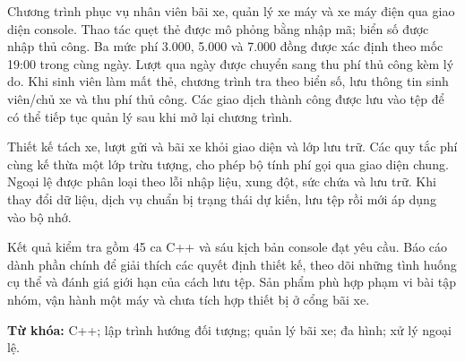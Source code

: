 Chương trình phục vụ nhân viên bãi xe, quản lý xe máy và xe máy điện qua giao diện console. Thao tác quẹt thẻ được mô phỏng bằng nhập mã; biển số được nhập thủ công. Ba mức phí 3.000, 5.000 và 7.000 đồng được xác định theo mốc 19:00 trong cùng ngày. Lượt qua ngày được chuyển sang thu phí thủ công kèm lý do. Khi sinh viên làm mất thẻ, chương trình tra theo biển số, lưu thông tin sinh viên/chủ xe và thu phí thủ công. Các giao dịch thành công được lưu vào tệp để có thể tiếp tục quản lý sau khi mở lại chương trình.

Thiết kế tách xe, lượt gửi và bãi xe khỏi giao diện và lớp lưu trữ. Các quy tắc phí cùng kế thừa một lớp trừu tượng, cho phép bộ tính phí gọi qua giao diện chung. Ngoại lệ được phân loại theo lỗi nhập liệu, xung đột, sức chứa và lưu trữ. Khi thay đổi dữ liệu, dịch vụ chuẩn bị trạng thái dự kiến, lưu tệp rồi mới áp dụng vào bộ nhớ.

Kết quả kiểm tra gồm 45 ca C++ và sáu kịch bản console đạt yêu cầu. Báo cáo dành phần chính để giải thích các quyết định thiết kế, theo dõi những tình huống cụ thể và đánh giá giới hạn của cách lưu tệp. Sản phẩm phù hợp phạm vi bài tập nhóm, vận hành một máy và chưa tích hợp thiết bị ở cổng bãi xe.

\vspace{0.5cm}
\noindent\textbf{Từ khóa:} C++; lập trình hướng đối tượng; quản lý bãi xe; đa hình; xử lý ngoại lệ.
